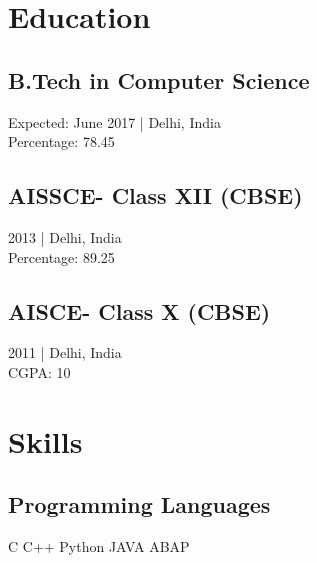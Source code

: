 \documentclass[]{resume-openfont}
\begin{document}
%
%



%
%

\begin{minipage}[t]{0.33\textwidth} 


\section{Education} 

\subsection{B.Tech in Computer Science}
Expected: June 2017 | Delhi, India \\ Percentage: 78.45
\sectionsep

\subsection{AISSCE- Class XII (CBSE)}
2013 | Delhi, India \\ Percentage: 89.25
\sectionsep

\subsection{AISCE- Class X (CBSE)}
2011 | Delhi, India \\ CGPA: 10
\sectionsep


\section{Skills}
\subsection{Programming Languages}
C \textbullet{} C++ \textbullet{} Python \textbullet{} JAVA \textbullet{} ABAP
\sectionsep

\end{minipage}
\end{document}
